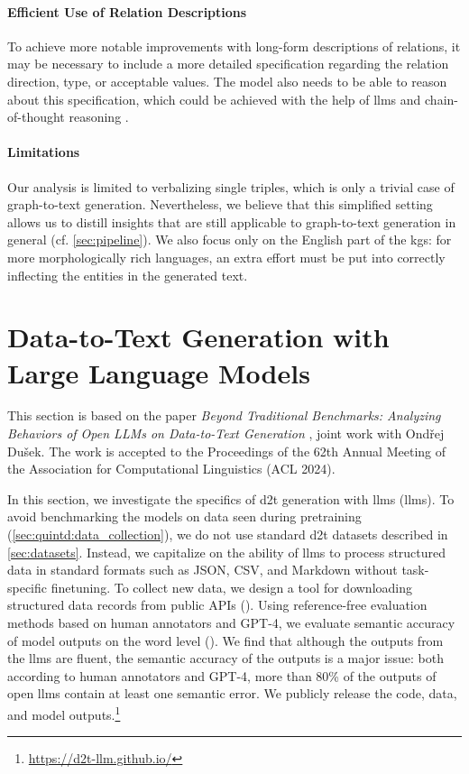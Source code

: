 \paragraph{Efficient Use of Relation Descriptions} To achieve more notable improvements with long-form descriptions of relations, it may be necessary to include a more detailed specification regarding the relation direction, type, or acceptable values. The model also needs to be able to reason about this specification, which could be achieved with the help of \acp{llm} and chain-of-thought reasoning \cite{weiChainThoughtPrompting2022,zhaoInvestigatingTabletoTextGeneration2023}.


\paragraph{Limitations} Our analysis is limited to verbalizing single triples, which is only a trivial case of graph-to-text generation. Nevertheless, we believe that this simplified setting allows us to distill insights that are still applicable to graph-to-text generation in general (cf. \autoref{sec:pipeline}). We also focus only on the English part of the \acp{kg}: for more morphologically rich languages, an extra effort must be put into correctly inflecting the entities in the generated text.






\section{Data-to-Text Generation with Large Language Models}
\label{sec:quintd}

\begin{refbox}
    This section is based on the paper \emph{Beyond Traditional Benchmarks: Analyzing Behaviors of Open LLMs on Data-to-Text Generation} \cite{kasnerReferenceBasedMetricsAnalyzing2024}, joint work with Ondřej Dušek. The work is accepted to the Proceedings of the 62th Annual Meeting of the Association for Computational Linguistics (ACL 2024).
\end{refbox}
In this section, we investigate the specifics of \ac{d2t} generation with \aclp{llm} (\acsp{llm}). To avoid benchmarking the models on data seen during pretraining (\autoref{sec:quintd:data_collection}), we do not use standard \ac{d2t} datasets described in \autoref{sec:datasets}. Instead, we capitalize on the ability of \acp{llm} to process structured data in standard formats such as JSON, CSV, and Markdown without task-specific finetuning. To collect new data, we design a tool for downloading structured data records from public APIs ().
Using reference-free evaluation methods based on human annotators and GPT-4, we evaluate semantic accuracy of model outputs on the word level ().
We find that although the outputs from the \acp{llm} are fluent, the semantic accuracy of the outputs is a major issue: both according to human annotators and GPT-4, more than 80\% of the outputs of open \acp{llm} contain at least one semantic error. We publicly release the code, data, and model outputs.\footnote{\url{https://d2t-llm.github.io/}}


